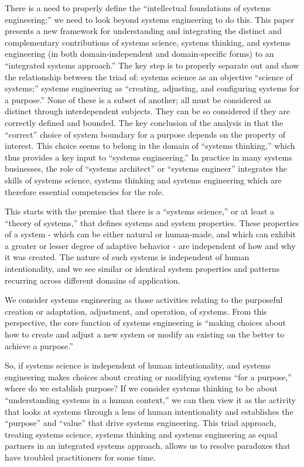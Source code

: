There is a need to properly define the ``intellectual foundations of systems engineering;'' we need to look beyond systems engineering to do this. This paper presents a new framework for understanding and integrating the distinct and complementary contributions of systems science, systems thinking, and systems engineering (in both domain-independent and domain-specific forms) to an ``integrated systems approach.'' The key step is to properly separate out and show the relationship between the triad of: systems science as an objective ``science of systems;'' systems engineering as ``creating, adjusting, and configuring systems for a purpose.'' None of these is a subset of another; all must be considered as distinct through interdependent subjects. They can be so considered if they are correctly defined and bounded. The key conclusion of the analysis in that the ``correct'' choice of system boundary for a purpose depends on the property of interest. This choice seems to belong in the domain of ``systems thinking,'' which thus provides a key input to ``systems engineering.'' In practice in many systems businesses, the role of “systems architect” or ``systems engineer'' integrates the skills of systems science, systems thinking and systems engineering which are therefore essential competencies for the role.

This starts with the premise that there is a ``systems science,'' or at least a ``theory of systems,'' that defines systems and system properties. These properties of a system - which can be either natural or human-made, and which can exhibit a greater or lesser degree of adaptive behavior - are independent of how and why it was created. The nature of such systems is independent of human intentionality, and we see similar or identical system properties and patterns recurring across different domains of application.

We consider systems engineering as those activities relating to the purposeful creation or adaptation, adjustment, and operation, of systems. From this perspective, the core function of systems engineering is ``making choices about how to create and adjust a new system or modify an existing on the better to achieve a purpose.''

So, if systems science is independent of human intentionality, and systems engineering makes choices about creating or modifying systems ``for a purpose,'' where do we establish purpose?  If we consider systems thinking to be about ``understanding systems in a human context,'' we can then view it as the activity that looks at systems through a lens of human intentionality and establishes the ``purpose'' and ``value'' that drive systems engineering. This triad approach, treating systems science, systems thinking and systems engineering as equal partners in an integrated systems approach, allows us to resolve paradoxes that have troubled practitioners for some time.

